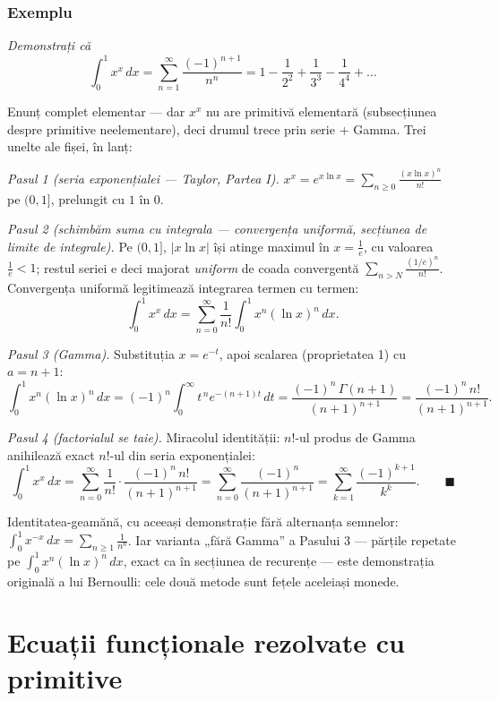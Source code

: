 \subsubsection*{Exemplu}

\emph{Demonstrați că}
\[
\int_0^1x^{x}\,dx=\sum_{n=1}^{\infty}\frac{(-1)^{n+1}}{n^{n}}=1-\frac{1}{2^2}+\frac{1}{3^3}-\frac{1}{4^4}+\dots
\]

Enunț complet elementar --- dar $x^x$ nu are primitivă elementară (subsecțiunea despre primitive neelementare), deci drumul trece prin serie $+$ Gamma. Trei unelte ale fișei, în lanț:

\emph{Pasul 1 (seria exponențialei --- Taylor, Partea I).} $x^{x}=e^{x\ln x}=\displaystyle\sum_{n\ge0}\frac{(x\ln x)^n}{n!}$ pe $(0,1]$, prelungit cu $1$ în $0$.

\emph{Pasul 2 (schimbăm suma cu integrala --- convergența uniformă, secțiunea de limite de integrale).} Pe $(0,1]$, $|x\ln x|$ își atinge maximul în $x=\frac1e$, cu valoarea $\frac1e<1$; restul seriei e deci majorat \emph{uniform} de coada convergentă $\sum_{n>N}\frac{(1/e)^n}{n!}$. Convergența uniformă legitimează integrarea termen cu termen:
\[
\int_0^1x^x\,dx=\sum_{n=0}^{\infty}\frac1{n!}\int_0^1x^n(\ln x)^n\,dx.
\]

\emph{Pasul 3 (Gamma).} Substituția $x=e^{-t}$, apoi scalarea (proprietatea 1) cu $a=n+1$:
\[
\int_0^1x^n(\ln x)^n\,dx=(-1)^n\!\int_0^{\infty}t^{\,n}e^{-(n+1)t}\,dt
=\frac{(-1)^n\,\Gamma(n+1)}{(n+1)^{n+1}}
=\frac{(-1)^n\,n!}{(n+1)^{n+1}}.
\]

\emph{Pasul 4 (factorialul se taie).} Miracolul identității: $n!$-ul produs de Gamma anihilează exact $n!$-ul din seria exponențialei:
\[
\int_0^1x^x\,dx=\sum_{n=0}^{\infty}\frac{1}{n!}\cdot\frac{(-1)^n\,n!}{(n+1)^{n+1}}
=\sum_{n=0}^{\infty}\frac{(-1)^n}{(n+1)^{n+1}}
=\sum_{k=1}^{\infty}\frac{(-1)^{k+1}}{k^{k}}.\qquad\blacksquare
\]

Identitatea-geamănă, cu aceeași demonstrație fără alternanța semnelor: $\displaystyle\int_0^1x^{-x}\,dx=\sum_{n\ge1}\frac{1}{n^n}$. Iar varianta „fără Gamma'' a Pasului 3 --- părțile repetate pe $\int_0^1x^n(\ln x)^n\,dx$, exact ca în secțiunea de recurențe --- este demonstrația originală a lui Bernoulli: cele două metode sunt fețele aceleiași monede.

\section{Ecuații funcționale rezolvate cu primitive}

